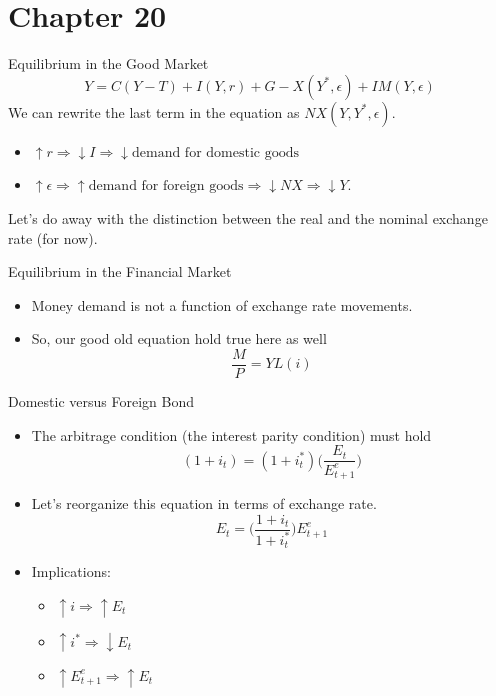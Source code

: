 \documentclass[shownotes,11pt, aspectratio=169]{beamer}
\begin{document}
\section{Chapter 20}
\begin{frame}{Equilibrium in the Good Market}
\[ Y = C(Y - T) + I(Y,r) + G - X(Y^{\ast}, \epsilon) + IM(Y, \epsilon) \]
We can rewrite the last term in the equation as $NX(Y,Y^{\ast}, \epsilon)$.
\begin{itemize}
\item $\uparrow r \Rightarrow \downarrow I \Rightarrow \downarrow \text{demand for domestic goods}$
\item $\uparrow \epsilon \Rightarrow \uparrow \text{demand for foreign goods} \Rightarrow \downarrow NX \Rightarrow \downarrow Y$.
\end{itemize}
Let's do away with the distinction between the real and the nominal exchange rate (for now).
\end{frame}

\begin{frame}{Equilibrium in the Financial Market}
\begin{itemize}
\item Money demand is not a function of exchange rate movements. 
\item So, our good old equation hold true here as well
      \[ \frac{M}{P} = YL(i) \]
\end{itemize}
\end{frame}

\begin{frame}{Domestic versus Foreign Bond}
\begin{itemize}
\item The arbitrage condition (the interest parity condition) must hold
     \[ (1 + i_t) = (1 + i_t^{\ast})\Bigg(\frac{E_t}{E_{t+1}^e}\Bigg) \]
\item Let's reorganize this equation in terms of exchange rate.
      \[ E_t = \Bigg(\frac{1 + i_t}{1 + i_t^{\ast}}\Bigg)E_{t+1}^e \]
\item Implications:
      \begin{itemize}
      \item $\uparrow i \Rightarrow \uparrow E_t$
      \item $\uparrow i^{\ast} \Rightarrow \downarrow E_t$
      \item $\uparrow E_{t+1}^e \Rightarrow \uparrow E_t$
       \end{itemize}
\end{itemize}
\end{frame}
\end{document}
